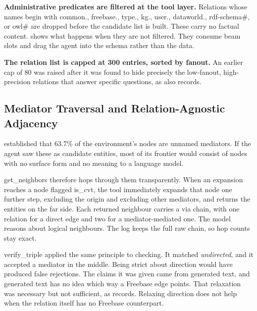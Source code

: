 \textbf{Administrative predicates are filtered at the tool layer.} Relations
whose names begin with \textsf{common.}, \textsf{freebase.}, \textsf{type.},
\textsf{kg.}, \textsf{user.}, \textsf{dataworld.}, \textsf{rdf-schema\#}, or
\textsf{owl\#} are dropped before the candidate list is built. These carry no
factual content.  shows what happens when they are
not filtered. They consume beam slots and drag the agent into the schema rather
than the data.

\textbf{The relation list is capped at 300 entries, sorted by fanout.} An
earlier cap of 80 was raised after it was found to hide precisely the
low-fanout, high-precision relations that answer specific questions, as
 also records.

\subsection{Mediator Traversal and Relation-Agnostic
Adjacency}\label{sec:tool-adjacency}

 established that 63.7\% of the environment's nodes
are unnamed mediators. If the agent saw these as candidate entities, most of
its frontier would consist of
nodes with no surface form and no meaning to a language model.

\textsf{get\_neighbors} therefore hops through them transparently. When an
expansion reaches a node flagged \textsf{is\_cvt}, the tool immediately expands
that node one further step, excluding the origin and excluding other mediators,
and returns the entities on the far side. Each returned neighbour carries a
\textsf{via} chain, with one relation for a direct edge and two for a
mediator-mediated one. The model reasons about logical neighbours. The log keeps
the full raw chain, so hop counts stay exact.

\textsf{verify\_triple} applied the same principle to checking. It matched
\emph{undirected}, and it accepted a mediator in the middle. Being strict about
direction would have produced false rejections. The claims it was given came
from generated text, and generated text has no idea which way a Freebase edge
points. That relaxation was necessary but not sufficient, as
 records. Relaxing direction does not help when the
relation itself has no Freebase counterpart.

